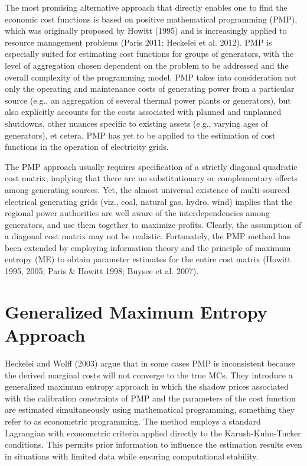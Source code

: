 The most promising alternative approach that directly enables one to
find the economic cost functions is based on positive mathematical
programming (PMP), which was originally proposed by Howitt (1995) and is
increasingly applied to resource management problems (Paris 2011;
Heckelei et al. 2012). PMP is especially suited for estimating cost
functions for groups of generators, with the level of aggregation chosen
dependent on the problem to be addressed and the overall complexity of
the programming model. PMP takes into consideration not only the
operating and maintenance costs of generating power from a particular
source (e.g., an aggregation of several thermal power plants or
generators), but also explicitly accounts for the costs associated with
planned and unplanned shutdowns, other nuances specific to existing
assets (e.g., varying ages of generators), et cetera. PMP has yet to be
applied to the estimation of cost functions in the operation of
electricity grids.

The PMP approach usually requires specification of a strictly diagonal
quadratic cost matrix, implying that there are no substitutionary or
complementary effects among generating sources. Yet, the almost
universal existence of multi-sourced electrical generating grids (viz.,
coal, natural gas, hydro, wind) implies that the regional power
authorities are well aware of the interdependencies among generators,
and use them together to maximize profits. Clearly, the assumption of a
diagonal cost matrix may not be realistic. Fortunately, the PMP method
has been extended by employing information theory and the principle of
maximum entropy (ME) to obtain parameter estimates for the entire cost
matrix (Howitt 1995, 2005; Paris \& Howitt 1998; Buysee et al. 2007).

\section{Generalized Maximum Entropy
	Approach}\label{generalized-maximum-entropy-approach}

Heckelei and Wolff (2003) argue that in some cases PMP is inconsistent
because the derived marginal costs will not converge to the true MCs.
They introduce a generalized maximum entropy approach in which the
shadow prices associated with the calibration constraints of PMP and the
parameters of the cost function are estimated simultaneously using
mathematical programming, something they refer to as econometric
programming. The method employs a standard Lagrangian with econometric
criteria applied directly to the Karush-Kuhn-Tucker conditions. This
permits prior information to influence the estimation results even in
situations with limited data while ensuring computational stability.


